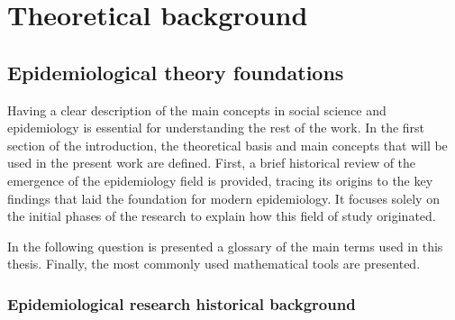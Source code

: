 \chapter{Theoretical background}

\section{Epidemiological theory foundations}

Having a clear description of the main concepts in social science and epidemiology is essential for understanding the rest of the work. In the first section of the introduction, the theoretical basis and main concepts that will be used in the present work are defined. 
First, a brief historical review of the emergence of the epidemiology field is provided, tracing its origins to the key findings that laid the foundation for modern epidemiology. It focuses solely on the initial phases of the research to explain how this field of study originated.
 
In the following question is presented a glossary of the main terms used in this thesis. Finally, the most commonly used mathematical tools are presented.
\subsection{Epidemiological research historical background}


